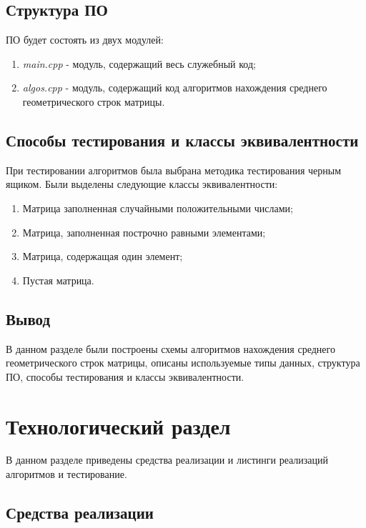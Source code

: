 \subsection{Структура ПО}

ПО будет состоять из двух модулей:
		
\begin{enumerate}
	\item \textit{main.cpp} - модуль, содержащий весь служебный код;
	\item \textit{algos.cpp} - модуль, содержащий код алгоритмов нахождения среднего геометрического строк матрицы.
\end{enumerate}

\subsection{Способы тестирования и классы эквивалентности}

При тестировании алгоритмов была выбрана методика тестирования черным ящиком. Были выделены следующие классы эквивалентности:

\begin{enumerate}
	\item Матрица заполненная случайными положительными числами;
	\item Матрица, заполненная построчно равными элементами;
	\item Матрица, содержащая один элемент;
	\item Пустая матрица.
\end{enumerate}
\subsection{Вывод} 

В данном разделе были построены схемы алгоритмов нахождения среднего геометрического строк матрицы, описаны используемые типы данных, структура ПО, способы тестирования и классы эквивалентности.

\section{Технологический раздел}

В данном разделе приведены средства реализации и листинги реализаций алгоритмов и тестирование.

\subsection{Средства реализации}

